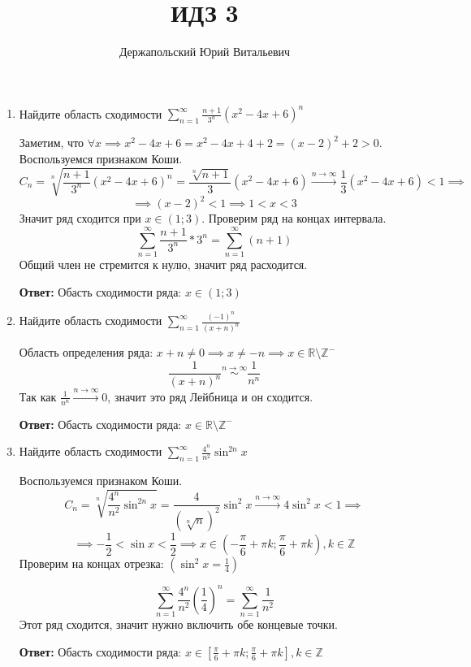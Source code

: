 \documentclass[10pt]{article} %
\title{ИДЗ 3}
\author{Держапольский Юрий Витальевич}
\date{} %
\begin{document}
 \begin{large}  
\maketitle


\begin{enumerate}
\item Найдите область сходимости $ \sum\limits_{n=1}^{\infty}\frac{n+1}{3^n}(x^2-4x+6)^n $

Заметим, что $\forall  x \implies x^2-4x+6 = x^2-4x+4+2 = (x-2)^2 + 2 > 0 $. Воспользуемся признаком Коши.
\[ C_{n} = \sqrt[n]{\frac{n+1}{3^n}(x^2-4x+6)^n  } = \frac{\sqrt[n]{n+1}}{3}(x^2-4x+6) \xrightarrow{n\to\infty} \frac{1}{3}(x^2-4x+6) < 1 \implies \]
\[ \implies (x-2)^2 < 1 \implies 1< x < 3 \]
Значит ряд сходится при $ x \in (1;3) $. Проверим ряд на концах интервала.
\[  \sum_{n=1}^{\infty}\frac{n+1}{3^n} * 3^n = \sum_{n=1}^{\infty}(n+1) \]
Общий член не стремится к нулю, значит ряд расходится.

\textbf{Ответ:} Обасть сходимости ряда: $ x \in (1;3) $

\item Найдите область сходимости $ \sum\limits_{n=1}^{\infty}\frac{(-1)^n}{(x+n)^n} $

Область определения ряда: $ x + n \neq 0 \implies x \neq -n \implies x \in \mathbb{R} \setminus \mathbb{Z}^{-}   $
\[ \frac{1}{(x+n)^n} \stackrel{n\to\infty}{\sim} \frac{1}{n^n} \]
Так как $ \frac{1}{n^n} \xrightarrow{n\to\infty} 0 $, значит это ряд Лейбница и он сходится.

\textbf{Ответ:} Обасть сходимости ряда: $ x \in \mathbb{R} \setminus \mathbb{Z}^{-} $

\item Найдите область сходимости $ \sum\limits_{n=1}^{\infty}\frac{4^n}{n^2}\sin^{2n}x $

Воспользуемся признаком Коши.
\[ C_{n} = \sqrt[n]{\frac{4^n}{n^2}\sin^{2n}x} = \frac{4}{(\sqrt[n]{n})^2} \sin^{2}x \xrightarrow{n\to\infty} 4 \sin^{2}x < 1 \implies \]
\[ \implies -\frac{1}{2} < \sin x < \frac{1}{2} \implies x \in (-\frac{\pi}{6} + \pi k; \frac{\pi}{6} + \pi k), k \in \mathbb{Z} \]
Проверим на концах отрезка: $(\sin^2 x = \frac{1}{4})$

\[ \sum_{n=1}^{\infty}\frac{4^n}{n^2} \left( \frac{1}{4}\right)^n = \sum_{n=1}^{\infty}\frac{1}{n^2} \]
Этот ряд сходится, значит нужно включить обе концевые точки.

\textbf{Ответ:} Обасть сходимости ряда: $ x \in [\frac{\pi}{6} + \pi k; \frac{\pi}{6} + \pi k], k \in \mathbb{Z} $


\end{enumerate}
\end{large}
\end{document}
